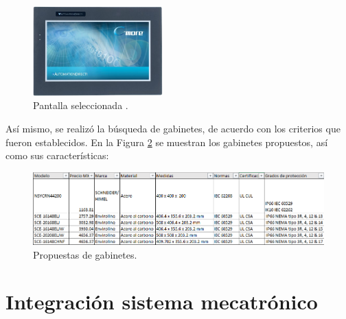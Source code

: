 \begin{figure}[H]
	\centering
	\includegraphics[width=5cm]{imagenes/PantallaG}
	\caption{Pantalla seleccionada \cite{DDI2}.}
	\label{fig:PantallaG}
\end{figure}

Así mismo, se realizó la búsqueda de gabinetes, de acuerdo con los criterios que fueron establecidos. En la Figura \ref{fig:Gabinetes} se muestran los gabinetes propuestos, así como sus características: 
\begin{figure}[H]
	\centering
	\includegraphics[width=14cm]{imagenes/Gabinetes}
	\caption{Propuestas de gabinetes.}
	\label{fig:Gabinetes}
\end{figure}

\newpage
\chapter{Integración sistema mecatrónico}
